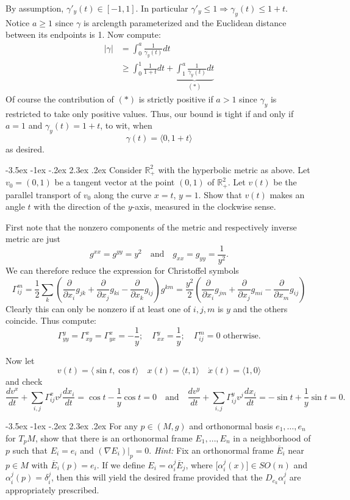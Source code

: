 \documentclass[10pt]{article}
\makeatletter
\renewcommand\section{\@startsection{section}{1}{\z@}%
                                  {-3.5ex \@plus -1ex \@minus -.2ex}%
                                  {2.3ex \@plus.2ex}%
                                  {\normalfont\large\bfseries}}
\newcommand{\R}{{\ensuremath{\mathbb{R}}} }
\newcommand{\del}{{\ensuremath{\partial}} }
\newcommand{\xt}[2]{\ensuremath{\Gamma^{#1}_{#2}}}
\newcommand{\hint}[1]{{\emph{Hint:} #1}} %
\makeatother
\begin{document}
By assumption, $\gamma'_y(t) \in [-1,1]$. In particular $\gamma'_y \leq 1 \Rightarrow \gamma_y(t) \leq 1+t$. 
Notice $a \geq 1$ since $\gamma$ is arclength parameterized and the Euclidean distance between its endpoints is 1.
 Now compute:
\begin{align*}|\gamma| &=  \int_0^a \frac{1}{ \gamma_y(t)} dt \\ 
&\geq \int_0^1 \frac{1}{1+t} dt + \underbrace{\int_1^a \frac{1}{\gamma_y(t)} dt}_{(*)} \end{align*}
Of course the contribution of $(*)$ is strictly positive if $a >1$ since $\gamma_y$ is restricted to take only
 positive values. Thus, our bound is tight if and only if $a = 1$ and $\gamma_y(t) =1+ t$, to wit, when
\[\gamma(t) =  \langle 0, 1 +t \rangle\]
as desired.

\section{Consider $\R_+^2$ with the hyperbolic metric as above. Let $v_0 = (0,1)$ be a tangent vector at the point $(0,1)$ of $\R_+^2$. Let $v(t)$ be the parallel transport of $v_0$ along the curve $x=t$, $y=1$. Show that $v(t)$ makes an angle $t$ with the direction of the $y$-axis, measured in the clockwise sense.}

First note that the nonzero components of the metric and respectively inverse metric are just
\[ g^{xx} = g^{yy} = y^2 \quad \mbox{and} \quad g_{xx} = g_{yy} = \frac{1}{y^2}.\]
We can therefore reduce the expression for Christoffel symbols
\[ \xt{m}{ij} = \frac{1}{2} \sum_k \left( \frac{\del}{\del x_i } g_{jk} + \frac{\del}{\del x_j}g_{ki} - \frac{\del}{\del x_k} g_{ij} \right) g^{km} = \frac{y^2}{2}  \left( \frac{\del}{\del x_i } g_{jm} + \frac{\del}{\del x_j}g_{mi} - \frac{\del}{\del x_m} g_{ij} \right)\]
Clearly this can only be nonzero if at least one of $i,j,m$ is $y$ and the others coincide. Thus compute:
\[\xt{y}{yy} =\xt{x}{xy} =\xt{x}{yx} = - \frac{1}{y}; \quad \xt{y}{xx} = \frac{1}{y}; \quad \xt{m}{ij} = 0   \mbox{ otherwise} .\]

Now let 
\[v(t) = \langle \sin t, \cos t \rangle \quad x(t) = \langle t, 1 \rangle \quad \dot{x}(t) =\langle 1 , 0 \rangle \]
and check
\[\frac{dv^x}{dt } + \sum_{i,j} \xt{x}{ij} v^j \frac{dx_i}{dt} = \cos t - \frac{1}{y} \cos t = 0 \quad \mbox{and} \quad\frac{dv^y}{dt } + \sum_{i,j} \xt{y}{ij} v^j \frac{dx_i}{dt} = - \sin t + \frac{1}{y} \sin t=0.\]

\section{For any $p \in (M,g)$ and orthonormal basis $e_1, \dots, e_n$ for $T_p M$, show that there is an orthonormal frame $E_1, \dots, E_n$ in a neighborhood of $p$ such that $E_i = e_i$ and $(\nabla E_i)|_p = 0 $. \hint{Fix an orthonormal frame $\overline{E}_i$ near $p \in M$ with $\overline{E}_i(p) = e_i$. If we define $E_i = \alpha_i^j \overline{E}_j$, where [$\alpha_i^j (x)$]$\in SO(n)$ and $\alpha_i^j(p) = \delta_i^j$, then this will yield the desired frame provided that the $D_{e_k} \alpha_i^j$ are appropriately prescribed. }}
\end{document}
